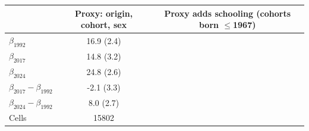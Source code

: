 \begin{tabular}{lcc}
\toprule
 & Proxy: origin, cohort, sex & Proxy adds schooling (cohorts born $\le$1967) \\
\midrule
$\beta_{1992}$ & 16.9 (2.4) \\
$\beta_{2017}$ & 14.8 (3.2) \\
$\beta_{2024}$ & 24.8 (2.6) \\
\midrule
$\beta_{2017}-\beta_{1992}$ & -2.1 (3.3) \\
$\beta_{2024}-\beta_{1992}$ & 8.0 (2.7) \\
\midrule
Cells & 15802 \\
\bottomrule
\end{tabular}
